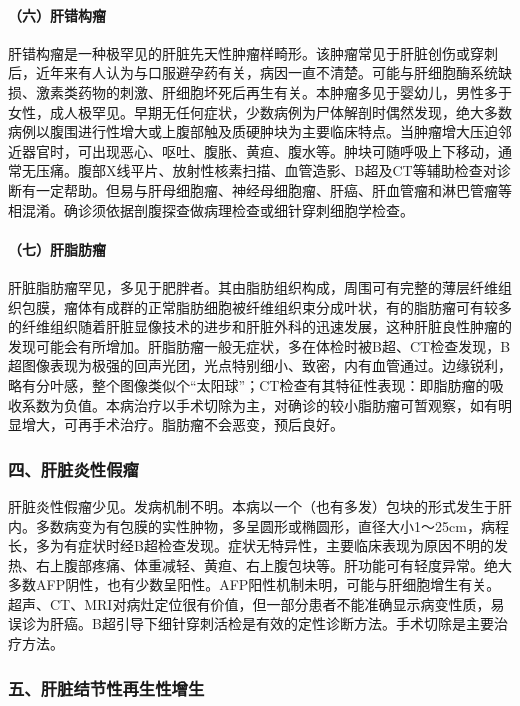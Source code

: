 \paragraph{（六）肝错构瘤}

肝错构瘤是一种极罕见的肝脏先天性肿瘤样畸形。该肿瘤常见于肝脏创伤或穿刺后，近年来有人认为与口服避孕药有关，病因一直不清楚。可能与肝细胞酶系统缺损、激素类药物的刺激、肝细胞坏死后再生有关。本肿瘤多见于婴幼儿，男性多于女性，成人极罕见。早期无任何症状，少数病例为尸体解剖时偶然发现，绝大多数病例以腹围进行性增大或上腹部触及质硬肿块为主要临床特点。当肿瘤增大压迫邻近器官时，可出现恶心、呕吐、腹胀、黄疸、腹水等。肿块可随呼吸上下移动，通常无压痛。腹部X线平片、放射性核素扫描、血管造影、B超及CT等辅助检查对诊断有一定帮助。但易与肝母细胞瘤、神经母细胞瘤、肝癌、肝血管瘤和淋巴管瘤等相混淆。确诊须依据剖腹探查做病理检查或细针穿刺细胞学检查。

\paragraph{（七）肝脂肪瘤}

肝脏脂肪瘤罕见，多见于肥胖者。其由脂肪组织构成，周围可有完整的薄层纤维组织包膜，瘤体有成群的正常脂肪细胞被纤维组织束分成叶状，有的脂肪瘤可有较多的纤维组织随着肝脏显像技术的进步和肝脏外科的迅速发展，这种肝脏良性肿瘤的发现可能会有所增加。肝脂肪瘤一般无症状，多在体检时被B超、CT检查发现，B超图像表现为极强的回声光团，光点特别细小、致密，内有血管通过。边缘锐利，略有分叶感，整个图像类似个“太阳球”；CT检查有其特征性表现：即脂肪瘤的吸收系数为负值。本病治疗以手术切除为主，对确诊的较小脂肪瘤可暂观察，如有明显增大，可再手术治疗。脂肪瘤不会恶变，预后良好。

\subsubsection{四、肝脏炎性假瘤}

肝脏炎性假瘤少见。发病机制不明。本病以一个（也有多发）包块的形式发生于肝内。多数病变为有包膜的实性肿物，多呈圆形或椭圆形，直径大小1～25cm，病程长，多为有症状时经B超检查发现。症状无特异性，主要临床表现为原因不明的发热、右上腹部疼痛、体重减轻、黄疸、右上腹包块等。肝功能可有轻度异常。绝大多数AFP阴性，也有少数呈阳性。AFP阳性机制未明，可能与肝细胞增生有关。超声、CT、MRI对病灶定位很有价值，但一部分患者不能准确显示病变性质，易误诊为肝癌。B超引导下细针穿刺活检是有效的定性诊断方法。手术切除是主要治疗方法。

\subsubsection{五、肝脏结节性再生性增生}

